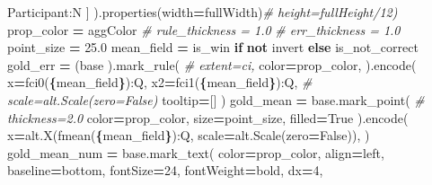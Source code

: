 \documentclass[
]{article}
\newenvironment{Shaded}{\begin{snugshade}}{\end{snugshade}}
\newcommand{\CommentTok}[1]{\textcolor[rgb]{0.56,0.35,0.01}{\textit{#1}}}
\newcommand{\ControlFlowTok}[1]{\textcolor[rgb]{0.13,0.29,0.53}{\textbf{#1}}}
\newcommand{\DecValTok}[1]{\textcolor[rgb]{0.00,0.00,0.81}{#1}}
\newcommand{\FloatTok}[1]{\textcolor[rgb]{0.00,0.00,0.81}{#1}}
\newcommand{\KeywordTok}[1]{\textcolor[rgb]{0.13,0.29,0.53}{\textbf{#1}}}
\newcommand{\NormalTok}[1]{#1}
\newcommand{\OperatorTok}[1]{\textcolor[rgb]{0.81,0.36,0.00}{\textbf{#1}}}
\newcommand{\SpecialCharTok}[1]{\textcolor[rgb]{0.81,0.36,0.00}{\textbf{#1}}}
\newcommand{\SpecialStringTok}[1]{\textcolor[rgb]{0.31,0.60,0.02}{#1}}
\newcommand{\StringTok}[1]{\textcolor[rgb]{0.31,0.60,0.02}{#1}}
\newcommand{\VariableTok}[1]{\textcolor[rgb]{0.00,0.00,0.00}{#1}}
\begin{document}
\begin{Shaded}
\begin{Highlighting}[]
            \StringTok{\textquotesingle{}Participant:N\textquotesingle{}}
\NormalTok{        ]}
\NormalTok{    ).properties(width}\OperatorTok{=}\NormalTok{fullWidth)}\CommentTok{\# height=fullHeight/12)}
\NormalTok{    prop\_color }\OperatorTok{=}\NormalTok{ aggColor}
    \CommentTok{\# rule\_thickness = 1.0}
    \CommentTok{\# err\_thickness = 1.0}
\NormalTok{    point\_size }\OperatorTok{=} \FloatTok{25.0}
\NormalTok{    mean\_field }\OperatorTok{=} \StringTok{\textquotesingle{}is\_win\textquotesingle{}} \ControlFlowTok{if} \KeywordTok{not}\NormalTok{ invert }\ControlFlowTok{else} \StringTok{\textquotesingle{}is\_not\_correct\textquotesingle{}}
\NormalTok{    gold\_err }\OperatorTok{=}\NormalTok{ (base}
\NormalTok{    ).mark\_rule(}
        \CommentTok{\# extent=\textquotesingle{}ci\textquotesingle{},}
\NormalTok{        color}\OperatorTok{=}\NormalTok{prop\_color,}
\NormalTok{    ).encode(}
\NormalTok{        x}\OperatorTok{=}\SpecialStringTok{f\textquotesingle{}ci0(}\SpecialCharTok{\{}\NormalTok{mean\_field}\SpecialCharTok{\}}\SpecialStringTok{):Q\textquotesingle{}}\NormalTok{,}
\NormalTok{        x2}\OperatorTok{=}\SpecialStringTok{f\textquotesingle{}ci1(}\SpecialCharTok{\{}\NormalTok{mean\_field}\SpecialCharTok{\}}\SpecialStringTok{):Q\textquotesingle{}}\NormalTok{,}
        \CommentTok{\# scale=alt.Scale(zero=False)}
\NormalTok{        tooltip}\OperatorTok{=}\NormalTok{[]}
\NormalTok{    )}
\NormalTok{    gold\_mean }\OperatorTok{=}\NormalTok{ base.mark\_point(}
        \CommentTok{\# thickness=2.0}
\NormalTok{        color}\OperatorTok{=}\NormalTok{prop\_color, size}\OperatorTok{=}\NormalTok{point\_size, filled}\OperatorTok{=}\VariableTok{True}
\NormalTok{    ).encode(}
\NormalTok{        x}\OperatorTok{=}\NormalTok{alt.X(}\SpecialStringTok{f\textquotesingle{}mean(}\SpecialCharTok{\{}\NormalTok{mean\_field}\SpecialCharTok{\}}\SpecialStringTok{):Q\textquotesingle{}}\NormalTok{,}
\NormalTok{            scale}\OperatorTok{=}\NormalTok{alt.Scale(zero}\OperatorTok{=}\VariableTok{False}\NormalTok{)),}
\NormalTok{    )}
\NormalTok{    gold\_mean\_num }\OperatorTok{=}\NormalTok{ base.mark\_text(}
\NormalTok{        color}\OperatorTok{=}\NormalTok{prop\_color,}
\NormalTok{        align}\OperatorTok{=}\StringTok{\textquotesingle{}left\textquotesingle{}}\NormalTok{,}
\NormalTok{        baseline}\OperatorTok{=}\StringTok{\textquotesingle{}bottom\textquotesingle{}}\NormalTok{,}
\NormalTok{        fontSize}\OperatorTok{=}\DecValTok{24}\NormalTok{,}
\NormalTok{        fontWeight}\OperatorTok{=}\StringTok{\textquotesingle{}bold\textquotesingle{}}\NormalTok{,}
\NormalTok{        dx}\OperatorTok{=}\DecValTok{4}\NormalTok{,}

\end{Highlighting}
\end{Shaded}
\end{document}
